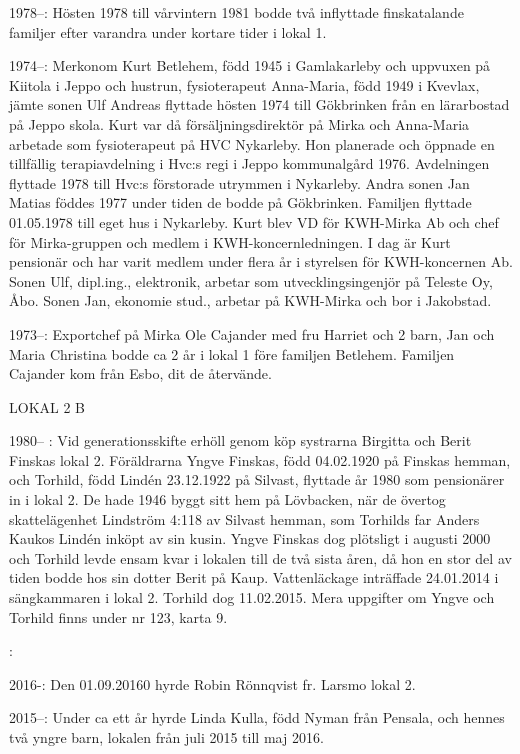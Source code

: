 1978--: Hösten 1978 till vårvintern 1981 bodde två inflyttade finskatalande familjer efter varandra under kortare tider i lokal 1.

1974--: Merkonom Kurt Betlehem, född 1945 i Gamlakarleby och uppvuxen på Kiitola i Jeppo och hustrun, fysioterapeut Anna-Maria, född 1949 i Kvevlax, jämte sonen Ulf Andreas flyttade hösten 1974 till Gökbrinken från en lärarbostad på Jeppo skola. Kurt var då försäljningsdirektör på Mirka och Anna-Maria arbetade som fysioterapeut på HVC Nykarleby. Hon planerade och öppnade en tillfällig terapiavdelning i Hvc:s regi i Jeppo kommunalgård 1976. Avdelningen flyttade 1978 till Hvc:s förstorade utrymmen i Nykarleby. Andra sonen Jan Matias föddes 1977 under tiden de bodde på Gökbrinken.  Familjen flyttade 01.05.1978 till eget hus i Nykarleby. Kurt blev VD för KWH-Mirka Ab och chef för Mirka-gruppen och medlem i KWH-koncernledningen. I dag är Kurt pensionär och har varit medlem under flera år i styrelsen för KWH-koncernen Ab. Sonen Ulf, dipl.ing., elektronik, arbetar som utvecklingsingenjör på Teleste Oy, Åbo. Sonen Jan, ekonomie stud., arbetar på KWH-Mirka och bor i Jakobstad.

1973--: Exportchef på Mirka Ole Cajander med fru Harriet och 2 barn, Jan och Maria Christina bodde ca 2 år i lokal 1 före familjen Betlehem. Familjen Cajander kom från Esbo, dit de återvände.


LOKAL 2 B

 1980-- :
Vid generationsskifte erhöll genom köp systrarna Birgitta och Berit Finskas lokal 2.  Föräldrarna Yngve Finskas, född 04.02.1920 på Finskas hemman, och Torhild, född Lindén 23.12.1922 på Silvast, flyttade år 1980 som pensionärer in i lokal 2. De hade 1946 byggt sitt hem på Lövbacken, när de övertog skattelägenhet Lindström 4:118 av Silvast hemman, som Torhilds far Anders Kaukos Lindén inköpt av sin kusin. Yngve Finskas dog plötsligt i augusti 2000 och Torhild levde ensam kvar i lokalen till de två sista åren, då hon en stor del av tiden bodde hos sin dotter Berit på Kaup. Vattenläckage inträffade 24.01.2014 i sängkammaren i lokal 2. Torhild dog 11.02.2015. Mera uppgifter om Yngve och Torhild finns under nr 123, karta 9.

:

2016-: Den 01.09.20160 hyrde Robin Rönnqvist fr. Larsmo lokal 2.

2015--: Under ca ett år hyrde Linda Kulla, född Nyman från Pensala, och hennes två yngre barn, lokalen från juli 2015 till maj 2016.

